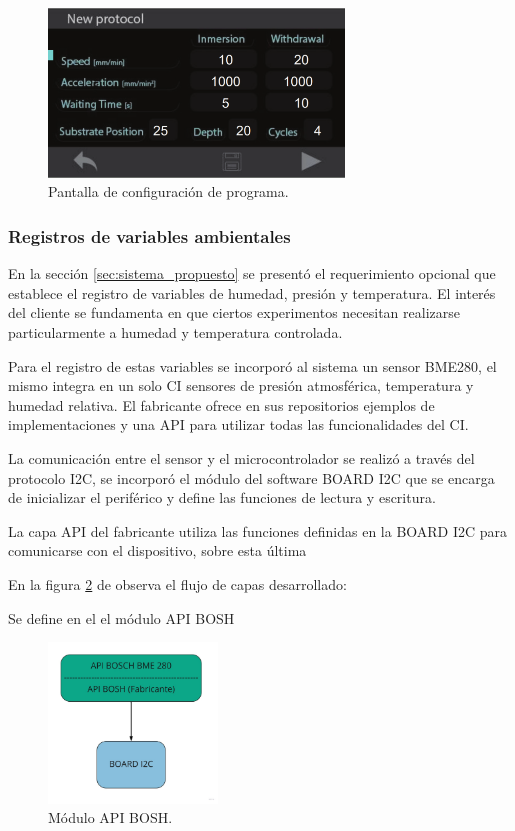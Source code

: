 \begin{figure}[h!]
	\centering
	\includegraphics[width=0.7\textwidth]{./Figures/pantalla.png}
	\caption{Pantalla de configuración de programa.}
	\label{fig:stone_a}
\end{figure}  


 

\subsubsection{Registros de variables ambientales}

En la sección \ref{sec:sistema_propuesto} se presentó el requerimiento opcional que establece el registro de variables de humedad, presión y temperatura. El interés del cliente se fundamenta en que ciertos experimentos necesitan realizarse particularmente a humedad y temperatura controlada. 

Para el registro de estas variables se incorporó al sistema un sensor BME280, el mismo integra en un solo CI sensores de presión atmosférica, temperatura y humedad relativa. El fabricante ofrece en sus repositorios \citep{web_repositorio_api_bosh} ejemplos de implementaciones y una API para utilizar todas las funcionalidades del CI.

La comunicación entre el sensor y el microcontrolador se realizó a través del protocolo I2C, se incorporó el módulo del software BOARD I2C que se encarga de inicializar el periférico y define las funciones de lectura y escritura.

La capa API del fabricante utiliza las funciones definidas en la BOARD I2C para comunicarse con el dispositivo, sobre esta última   

En la figura \ref{fig:api_bosh} de observa el flujo de capas desarrollado:

Se define en el el módulo API BOSH

\begin{figure}[h!]
	\centering
	\includegraphics[width=0.4\textwidth]{./Figures/api_bosh_bme.jpg}
	\caption{Módulo API BOSH.}
	\label{fig:api_bosh}
\end{figure}


